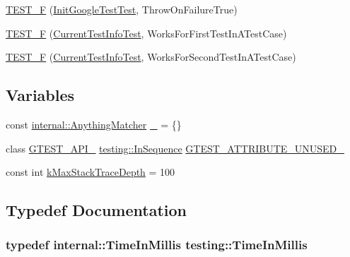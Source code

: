 \begin{DoxyCompactItemize}
\hyperlink{namespacetesting_ad7513c23ff21a4d2761cadfd2afe87e1}{T\+E\+S\+T\+\_\+F} (\hyperlink{classtesting_1_1_init_google_test_test}{Init\+Google\+Test\+Test}, Throw\+On\+Failure\+True)
\item 
\hyperlink{namespacetesting_a1e55a3ca18d877e1e83ce0ed9e7b5c79}{T\+E\+S\+T\+\_\+F} (\hyperlink{classtesting_1_1_current_test_info_test}{Current\+Test\+Info\+Test}, Works\+For\+First\+Test\+In\+A\+Test\+Case)
\item 
\hyperlink{namespacetesting_a3775bdbb5d24619425c52103e7ae6434}{T\+E\+S\+T\+\_\+F} (\hyperlink{classtesting_1_1_current_test_info_test}{Current\+Test\+Info\+Test}, Works\+For\+Second\+Test\+In\+A\+Test\+Case)
\end{DoxyCompactItemize}
\subsection*{Variables}
\begin{DoxyCompactItemize}
\item 
const \hyperlink{classtesting_1_1internal_1_1_anything_matcher}{internal\+::\+Anything\+Matcher} \hyperlink{namespacetesting_a4ba77a3f5b67166ff1b59d96a32346a2}{\+\_\+} = \{\}
\item 
class \hyperlink{gtest-port_8h_aa73be6f0ba4a7456180a94904ce17790}{G\+T\+E\+S\+T\+\_\+\+A\+P\+I\+\_\+} \hyperlink{classtesting_1_1_in_sequence}{testing\+::\+In\+Sequence} \hyperlink{namespacetesting_ae028f80705ba0f84ce7d036bf3793448}{G\+T\+E\+S\+T\+\_\+\+A\+T\+T\+R\+I\+B\+U\+T\+E\+\_\+\+U\+N\+U\+S\+E\+D\+\_\+}
\item 
const int \hyperlink{namespacetesting_ae605f2ccac04616bb7812ca72e517082}{k\+Max\+Stack\+Trace\+Depth} = 100
\end{DoxyCompactItemize}


\subsection{Typedef Documentation}
\subsubsection[{\texorpdfstring{Time\+In\+Millis}{TimeInMillis}}]{\setlength{\rightskip}{0pt plus 5cm}typedef {\bf internal\+::\+Time\+In\+Millis} {\bf testing\+::\+Time\+In\+Millis}}\hypertarget{namespacetesting_a992de1d091ce660f451d1e8b3ce30fd6}{}\label{namespacetesting_a992de1d091ce660f451d1e8b3ce30fd6}
